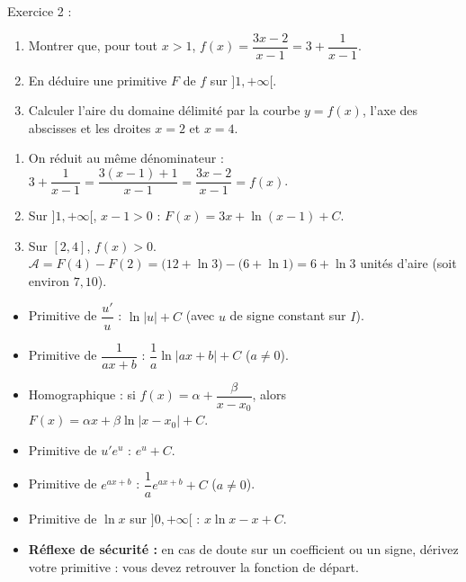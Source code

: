 \documentclass[11pt]{article}
\begin{document}
\begin{exercice}
Exercice 2 :
\begin{enumerate}
\item Montrer que, pour tout $x > 1$, $f(x) = \dfrac{3x-2}{x-1} = 3 + \dfrac{1}{x-1}$.
\item En déduire une primitive $F$ de $f$ sur $]1, +\infty[$.
\item Calculer l'aire du domaine délimité par la courbe $y=f(x)$, l'axe des abscisses et les droites $x=2$ et $x=4$.
\end{enumerate}
\end{exercice}

\begin{corrige}[Exercice 2]
\begin{enumerate}
\item On réduit au même dénominateur : $3 + \dfrac{1}{x-1} = \dfrac{3(x-1)+1}{x-1} = \dfrac{3x-2}{x-1} = f(x)$.
\item Sur $]1,+\infty[$, $x-1>0$ : $F(x) = 3x + \ln(x-1) + C$.
\item Sur $[2,4]$, $f(x) > 0$. $\mathcal{A} = F(4) - F(2) = \big(12 + \ln 3\big) - \big(6 + \ln 1\big) = 6 + \ln 3$ unités d'aire (soit environ $7,10$).
\end{enumerate}
\end{corrige}

\begin{aretenir}
\begin{itemize}
\item Primitive de $\dfrac{u'}{u}$ : $\ln|u| + C$ (avec $u$ de signe constant sur $I$).
\item Primitive de $\dfrac{1}{ax+b}$ : $\dfrac{1}{a}\ln|ax+b| + C$ \quad ($a \neq 0$).
\item Homographique : si $f(x) = \alpha + \dfrac{\beta}{x-x_0}$, alors $F(x) = \alpha x + \beta\ln|x-x_0| + C$.
\item Primitive de $u'e^{u}$ : $e^{u} + C$.
\item Primitive de $e^{ax+b}$ : $\dfrac{1}{a}e^{ax+b} + C$ \quad ($a \neq 0$).
\item Primitive de $\ln x$ sur $]0,+\infty[$ : $x\ln x - x + C$.
\item \textbf{Réflexe de sécurité :} en cas de doute sur un coefficient ou un signe, dérivez votre primitive : vous devez retrouver la fonction de départ.
\end{itemize}
\end{aretenir}
\end{document}
